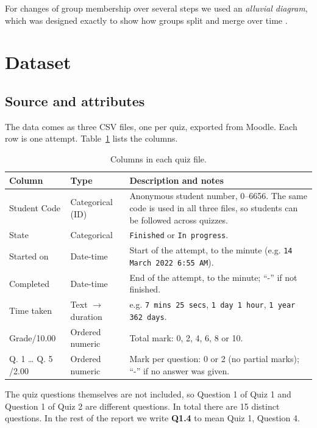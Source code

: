 \documentclass[11pt,a4paper]{article}
\begin{document}
For changes of group membership over several steps we used an \emph{alluvial
diagram}, which was designed exactly to show how groups split and merge over
time \citep{rosvall2010mapping}.

\section{Dataset}
\label{sec:dataset}

\subsection{Source and attributes}

The data comes as three CSV files, one per quiz, exported from Moodle. Each row
is one attempt. Table~\ref{tab:dict} lists the columns.

\begin{table}[H]
\centering
\small
\caption{Columns in each quiz file.}
\label{tab:dict}
\begin{tabularx}{\linewidth}{@{}l l X@{}}
\toprule
\textbf{Column} & \textbf{Type} & \textbf{Description and notes} \\
\midrule
Student Code & Categorical (ID) & Anonymous student number, 0--6656. The same code is used in all three files, so students can be followed across quizzes. \\
State & Categorical & \texttt{Finished} or \texttt{In progress}. \\
Started on & Date-time & Start of the attempt, to the minute (e.g. \texttt{14 March 2022 6:55 AM}). \\
Completed & Date-time & End of the attempt, to the minute; ``-'' if not finished. \\
Time taken & Text $\rightarrow$ duration & e.g. \texttt{7 mins 25 secs}, \texttt{1 day 1 hour}, \texttt{1 year 362 days}. \\
Grade/10.00 & Ordered numeric & Total mark: 0, 2, 4, 6, 8 or 10. \\
Q. 1 \ldots{} Q. 5 /2.00 & Ordered numeric & Mark per question: 0 or 2 (no partial marks); ``-'' if no answer was given. \\
\bottomrule
\end{tabularx}
\end{table}

The quiz questions themselves are not included, so Question 1 of Quiz 1 and
Question 1 of Quiz 2 are different questions. In total there are 15 distinct
questions. In the rest of the report we write \textbf{Q1.4} to mean Quiz 1,
Question 4.
\end{document}
